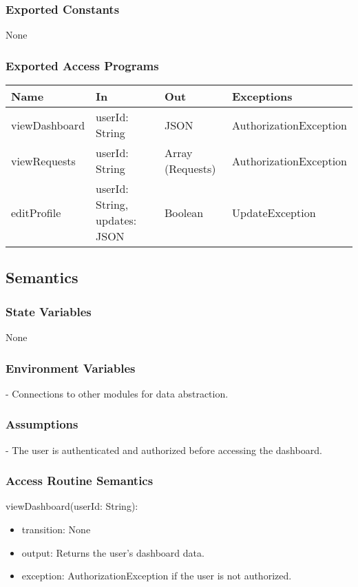 \documentclass[12pt, titlepage]{article}
\begin{document}
\subsubsection{Exported Constants}
None

\subsubsection{Exported Access Programs}
\begin{center}
\begin{tabular}{p{2cm} p{4cm} p{4cm} p{2cm}}
\hline
\textbf{Name} & \textbf{In} & \textbf{Out} & \textbf{Exceptions} \\
\hline
viewDashboard & userId: String & JSON & AuthorizationException \\
viewRequests & userId: String & Array (Requests) & AuthorizationException \\
editProfile & userId: String, updates: JSON & Boolean & UpdateException \\
\hline
\end{tabular}
\end{center}

\subsection{Semantics}

\subsubsection{State Variables}
None

\subsubsection{Environment Variables}
- Connections to other modules for data abstraction.

\subsubsection{Assumptions}
- The user is authenticated and authorized before accessing the dashboard.

\subsubsection{Access Routine Semantics}
\noindent viewDashboard(userId: String):
\begin{itemize}
\item transition: None
\item output: Returns the user's dashboard data.
\item exception: AuthorizationException if the user is not authorized.
\end{itemize}
\end{document}
